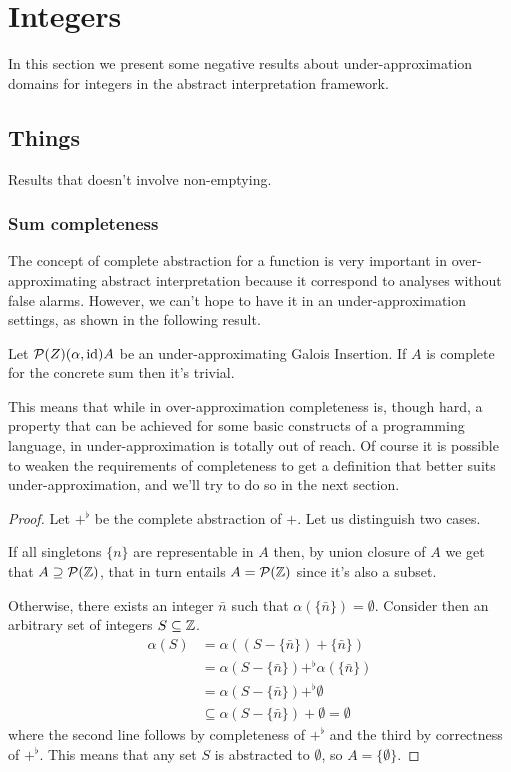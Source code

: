 \chapter{Integers}
In this section we present some negative results about under-approximation domains for integers in the abstract interpretation framework.

\section{Things}
Results that doesn't involve non-emptying.

\subsection{Sum completeness}
The concept of complete abstraction for a function is very important in over-approximating abstract interpretation because it correspond to analyses without false alarms. However, we can't hope to have it in an under-approximation settings, as shown in the following result.

\begin{prop}\label{ch3:th:sum-complete-trivial}
	Let $\mathcal{P}(Z) (\alpha, \text{id}) A$ be an under-approximating Galois Insertion. If $A$ is complete for the concrete sum then it's trivial.
\end{prop}
This means that while in over-approximation completeness is, though hard, a property that can be achieved for some basic constructs of a programming language, in under-approximation is totally out of reach. Of course it is possible to weaken the requirements of completeness to get a definition that better suits under-approximation, and we'll try to do so in the next section.

\begin{proof}
	Let $+^{\flat}$ be the complete abstraction of $+$.
	Let us distinguish two cases.

	If all singletons $\{ n \}$ are representable in $A$ then, by union closure of $A$ we get that $A \supseteq \mathcal{P}(\mathbb{Z})$, that in turn entails $A = \mathcal{P}(\mathbb{Z})$ since it's also a subset.

	Otherwise, there exists an integer $\bar{n}$ such that $\alpha(\{ \bar{n} \}) = \emptyset$. Consider then an arbitrary set of integers $S \subseteq \mathbb{Z}$.
	\begin{align*}
		\alpha(S) &= \alpha((S - \{ \bar{n} \}) + \{ \bar{n} \} ) \\
		&= \alpha(S - \{ \bar{n} \}) +^{\flat} \alpha(\{ \bar{n} \}) \\
		&= \alpha(S - \{ \bar{n} \}) +^{\flat} \emptyset \\
		&\subseteq \alpha(S - \{ \bar{n} \}) + \emptyset = \emptyset
	\end{align*}
	where the second line follows by completeness of $+^{\flat}$ and the third by correctness of $+^{\flat}$. This means that any set $S$ is abstracted to $\emptyset$, so $A = \{ \emptyset \}$.
\end{proof}

